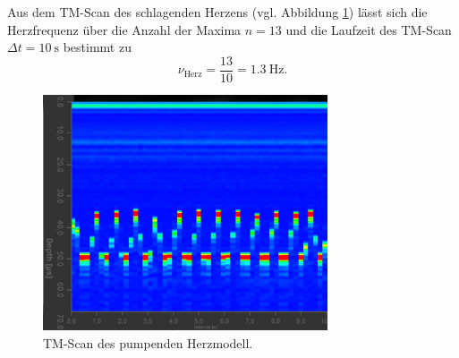Aus dem TM-Scan des schlagenden Herzens (vgl. Abbildung \ref{fig:herz}) lässt sich die Herzfrequenz über die Anzahl der Maxima $n=13$ und die Laufzeit des TM-Scan $\Delta t=\SI{10}{\second}$ bestimmt zu
\begin{equation*}
  \nu_\mathrm{Herz}=\frac{13}{10}=\SI{1.3}{\Hz} \text{.}
\end{equation*}

\begin{figure}
  \centering
  \includegraphics[width=0.75\textwidth]{bscan/herz1}
  \caption{TM-Scan des pumpenden Herzmodell.}
  \label{fig:herz}
\end{figure}

